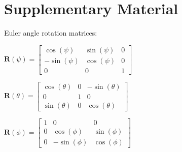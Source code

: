\section{Supplementary Material}
Euler angle rotation matrices:

$\mathbf{R}(\psi)=\left[ \begin{array}{ccc}{\cos (\psi)} & {\sin (\psi)} & {0} \\ {-\sin (\psi)} & {\cos (\psi)} & {0} \\ {0} & {0} & {1}\end{array}\right]$

$\mathbf{R}(\theta)=\left[ \begin{array}{ccc}{\cos (\theta)} & {0} & {-\sin (\theta)} \\ {0} & {1} & {0} \\ {\sin (\theta)} & {0} & {\cos (\theta)}\end{array}\right]$

$\mathbf{R}(\phi)=\left[ \begin{array}{ccc}{1} & {0} & {0} \\ {0} & {\cos (\phi)} & {\sin (\phi)} \\ {0} & {-\sin (\phi)} & {\cos (\phi)}\end{array}\right]$